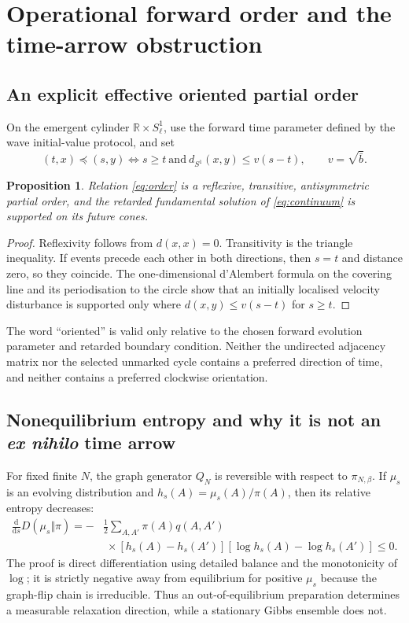 \documentclass[11pt,a4paper]{article}
\numberwithin{equation}{section}
\newtheorem{proposition}[theorem]{Proposition}
\newcommand{\barb}{\bar b}
\newcommand{\dd}{\mathrm d}
\newcommand{\1}{\mathbf{1}}
\begin{document}
\section{Operational forward order and the time-arrow obstruction}\label{sec:arrow}
\subsection{An explicit effective oriented partial order}
On the emergent cylinder $\mathbb R\times S^1_\ell$, use the forward time parameter defined by the wave initial-value protocol, and set
\begin{equation}\label{eq:order}
 (t,x)\preceq(s,y)\iff s\geq t\ \text{and}\
 d_{S^1}(x,y)\leq v(s-t),\qquad v=\sqrt{\barb}.
\end{equation}
\begin{proposition}\label{prop:order}
Relation \eqref{eq:order} is a reflexive, transitive, antisymmetric partial order, and the retarded fundamental solution of \eqref{eq:continuum} is supported on its future cones.
\end{proposition}
\begin{proof}
Reflexivity follows from $d(x,x)=0$. Transitivity is the triangle inequality. If events precede each other in both directions, then $s=t$ and distance zero, so they coincide. The one-dimensional d'Alembert formula on the covering line and its periodisation to the circle show that an initially localised velocity disturbance is supported only where $d(x,y)\leq v(s-t)$ for $s\geq t$.
\end{proof}
The word ``oriented'' is valid only relative to the chosen forward evolution parameter and retarded boundary condition. Neither the undirected adjacency matrix nor the selected unmarked cycle contains a preferred direction of time, and neither contains a preferred clockwise orientation.

\subsection{Nonequilibrium entropy and why it is not an \emph{ex nihilo} time arrow}
For fixed finite $N$, the graph generator $Q_N$ is reversible with respect to $\pi_{N,\beta}$. If $\mu_s$ is an evolving distribution and $h_s(A)=\mu_s(A)/\pi(A)$, then its relative entropy decreases:
\begin{equation}\label{eq:entropy}
\begin{aligned}
 \frac{\dd}{\dd s}D(\mu_s\Vert\pi)
 =-&\frac12\sum_{A,A'}\pi(A)q(A,A')\\[-1pt]
 &\;\times[h_s(A)-h_s(A')]
 [\log h_s(A)-\log h_s(A')]\leq0.
\end{aligned}
\end{equation}
The proof is direct differentiation using detailed balance and the monotonicity of $\log$; it is strictly negative away from equilibrium for positive $\mu_s$ because the graph-flip chain is irreducible. Thus an out-of-equilibrium preparation determines a measurable relaxation direction, while a stationary Gibbs ensemble does not.
\end{document}
